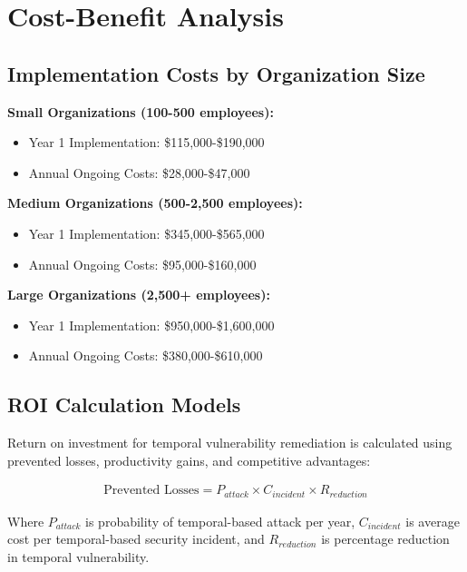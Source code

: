 \documentclass[11pt,a4paper]{article}
\begin{document}
\section{Cost-Benefit Analysis}

\subsection{Implementation Costs by Organization Size}

\textbf{Small Organizations (100-500 employees):}
\begin{itemize}
\item Year 1 Implementation: \$115,000-\$190,000
\item Annual Ongoing Costs: \$28,000-\$47,000
\end{itemize}

\textbf{Medium Organizations (500-2,500 employees):}
\begin{itemize}
\item Year 1 Implementation: \$345,000-\$565,000
\item Annual Ongoing Costs: \$95,000-\$160,000
\end{itemize}

\textbf{Large Organizations (2,500+ employees):}
\begin{itemize}
\item Year 1 Implementation: \$950,000-\$1,600,000
\item Annual Ongoing Costs: \$380,000-\$610,000
\end{itemize}

\subsection{ROI Calculation Models}

Return on investment for temporal vulnerability remediation is calculated using prevented losses, productivity gains, and competitive advantages:

\begin{align}
\text{Prevented Losses} = P_{attack} \times C_{incident} \times R_{reduction}
\end{align}

Where $P_{attack}$ is probability of temporal-based attack per year, $C_{incident}$ is average cost per temporal-based security incident, and $R_{reduction}$ is percentage reduction in temporal vulnerability.
\end{document}
